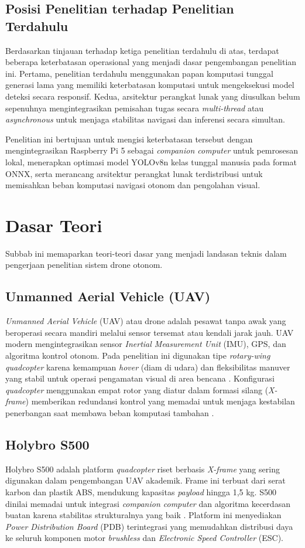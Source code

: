 \subsection{Posisi Penelitian terhadap Penelitian Terdahulu}
Berdasarkan tinjauan terhadap ketiga penelitian terdahulu di atas, terdapat beberapa keterbatasan operasional yang menjadi dasar pengembangan penelitian ini. Pertama, penelitian terdahulu menggunakan papan komputasi tunggal generasi lama yang memiliki keterbatasan komputasi untuk mengeksekusi model deteksi secara responsif. Kedua, arsitektur perangkat lunak yang diusulkan belum sepenuhnya mengintegrasikan pemisahan tugas secara \textit{multi-thread} atau \textit{asynchronous} untuk menjaga stabilitas navigasi dan inferensi secara simultan. 

Penelitian ini bertujuan untuk mengisi keterbatasan tersebut dengan mengintegrasikan Raspberry Pi 5 sebagai \textit{companion computer} untuk pemrosesan lokal, menerapkan optimasi model YOLOv8n kelas tunggal manusia pada format ONNX, serta merancang arsitektur perangkat lunak terdistribusi untuk memisahkan beban komputasi navigasi otonom dan pengolahan visual.

\section{Dasar Teori}
Subbab ini memaparkan teori-teori dasar yang menjadi landasan teknis dalam pengerjaan penelitian sistem drone otonom.

\subsection{Unmanned Aerial Vehicle (UAV)}
\textit{Unmanned Aerial Vehicle} (UAV) atau drone adalah pesawat tanpa awak yang beroperasi secara mandiri melalui sensor tersemat atau kendali jarak jauh. UAV modern mengintegrasikan sensor \textit{Inertial Measurement Unit} (IMU), GPS, dan algoritma kontrol otonom. Pada penelitian ini digunakan tipe \textit{rotary-wing quadcopter} karena kemampuan \textit{hover} (diam di udara) dan fleksibilitas manuver yang stabil untuk operasi pengamatan visual di area bencana \cite{Austin2021}. Konfigurasi \textit{quadcopter} menggunakan empat rotor yang diatur dalam formasi silang (\textit{X-frame}) memberikan redundansi kontrol yang memadai untuk menjaga kestabilan penerbangan saat membawa beban komputasi tambahan \cite{Quan2017MulticopterDesign}.

\subsection{Holybro S500}
Holybro S500 adalah platform \textit{quadcopter} riset berbasis \textit{X-frame} yang sering digunakan dalam pengembangan UAV akademik. Frame ini terbuat dari serat karbon dan plastik ABS, mendukung kapasitas \textit{payload} hingga 1,5 kg. S500 dinilai memadai untuk integrasi \textit{companion computer} dan algoritma kecerdasan buatan karena stabilitas strukturalnya yang baik \cite{Holybro2023}. Platform ini menyediakan \textit{Power Distribution Board} (PDB) terintegrasi yang memudahkan distribusi daya ke seluruh komponen motor \textit{brushless} dan \textit{Electronic Speed Controller} (ESC).

